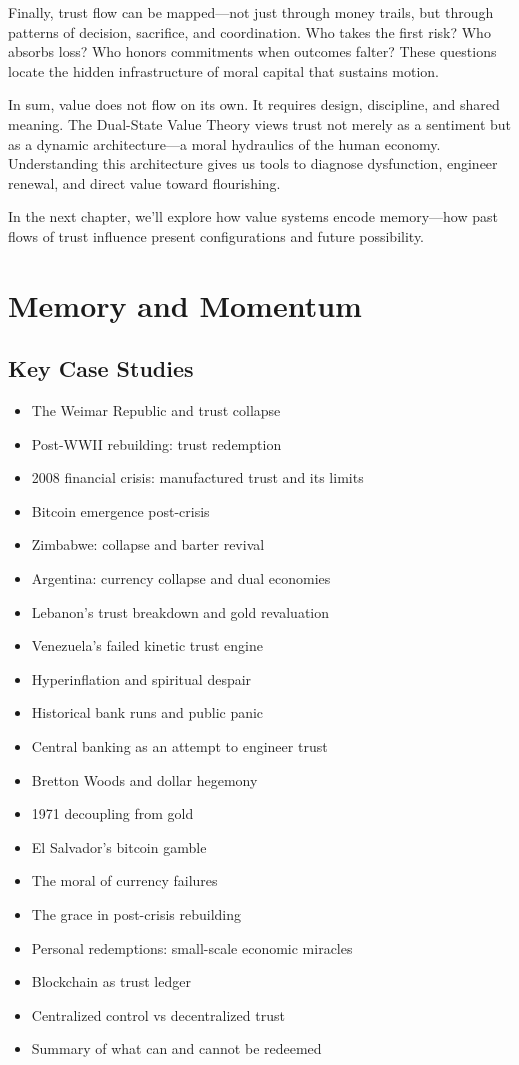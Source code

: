 \documentclass[11pt,oneside]{book}
\begin{document}
Finally, trust flow can be mapped—not just through money trails, but through patterns of decision, sacrifice, and coordination. Who takes the first risk? Who absorbs loss? Who honors commitments when outcomes falter? These questions locate the hidden infrastructure of moral capital that sustains motion.

In sum, value does not flow on its own. It requires design, discipline, and shared meaning. The Dual-State Value Theory views trust not merely as a sentiment but as a dynamic architecture—a moral hydraulics of the human economy. Understanding this architecture gives us tools to diagnose dysfunction, engineer renewal, and direct value toward flourishing.

In the next chapter, we’ll explore how value systems encode memory—how past flows of trust influence present configurations and future possibility.


\chapter{ Memory and Momentum}

\section{Key Case Studies}

\begin{itemize}
\item The Weimar Republic and trust collapse
\item Post-WWII rebuilding: trust redemption
\item 2008 financial crisis: manufactured trust and its limits
\item Bitcoin emergence post-crisis
\item Zimbabwe: collapse and barter revival
\item Argentina: currency collapse and dual economies
\item Lebanon's trust breakdown and gold revaluation
\item Venezuela's failed kinetic trust engine
\item Hyperinflation and spiritual despair
\item Historical bank runs and public panic
\item Central banking as an attempt to engineer trust
\item Bretton Woods and dollar hegemony
\item 1971 decoupling from gold
\item El Salvador's bitcoin gamble
\item The moral of currency failures
\item The grace in post-crisis rebuilding
\item Personal redemptions: small-scale economic miracles
\item Blockchain as trust ledger
\item Centralized control vs decentralized trust
\item Summary of what can and cannot be redeemed
\end{itemize}
\end{document}
